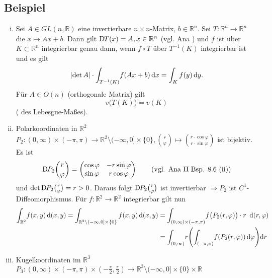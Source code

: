 \subsection[Beispiel: Affine Transformationen und Polarkoordinaten]{Beispiel} %
\label{sub:85}
\begin{enumerate}[(i)]
	\item Sei $A \in GL(n, \mathds{R})$ eine invertierbare $n \times n$-Matrix, $b \in \mathds{R}^n$. Sei $T : \mathds{R}^n \to \mathds{R}^n$ die 
	 $x \mapsto A x+ b$. Dann gilt $\D T(x) =A, x \in \mathds{R}^n$ (vgl. Ana ) und $f$ ist über $K \subset \mathds{R}^n$ integrierbar
	genau dann, wenn $f \circ T$ über $T ^{-1} (K)$ integrierbar ist und es gilt
	\[
		\abs*{\det A} \cdot  \int_{T ^{-1}(K)}\! f(Ax+b)  \, \mathrm{d}x = \int_K f(y)  \, \mathrm{d}y.
	\]
	Für $A \in O(n)$ (orthogonale Matrix) gilt 
	\[
		v\big( T(K)\big) = v(K)
	\]
	( des Lebesgue-Maßes).
	\item Polarkoordinaten in $\mathds{R}^2$ \\
	$P_2 : (0,\infty) \times (- \pi , \pi) \to \mathds{R}^2 \setminus (- \infty,0] \times \{0\}, \binom{r}{\varphi} \mapsto \binom{r \cdot \cos \varphi}{r \cdot \sin 
	\varphi}$ ist bijektiv. Es ist 
	\[
		\D P_2 \binom{r}{\varphi} = \begin{pmatrix}
			\cos \varphi & -r \sin \varphi \\
			\sin \varphi & r \cos \varphi
		\end{pmatrix} \tag{vgl. Ana \RM{2} Bsp. 8.6 (ii)}
	\]
	und $\det \D P_2 \binom{r}{\varphi} = r >0$. Daraus folgt $\D P_2 \binom{r}{\varphi} $ ist invertierbar $\Rightarrow P_2$ ist $C^1$-Diffeomorphismus. Für
	$f : \mathds{R}^2 \to \mathds{R}^2$ integrierbar gilt nun
	\begin{align*}
		\int_{\mathds{R}^2}\! f(x,y)  \, \mathrm{d}(x,y) = \int_{\mathds{R}^2 \setminus (- \infty, 0] \times \{0\}} f(x,y)  \, \mathrm{d}(x,y)
		&= \int_{(0, \infty) \times (-\pi , \pi )}\! f\big( P_2(r,\varphi)\big) \cdot r  \enspace \mathrm{d}(r,\varphi) \\ 
		&= \int_{(0,\infty)}\! r \enbrace*{ \int_{(-\pi ,\pi )}\! f(P_2(r,\varphi))  \, \mathrm{d}\varphi}  \mathrm{d}r 
	\end{align*}
	\item Kugelkoordinaten im $\mathds{R}^3$ \\
	$P_3 : (0,\infty) \times (-\pi ,\pi )\times (- \frac{\pi}{2}, \frac{\pi}{2}) \to \mathds{R}^3 \setminus (-\infty, 0] \times \{0\} \times \mathds{R}$

\end{enumerate}
